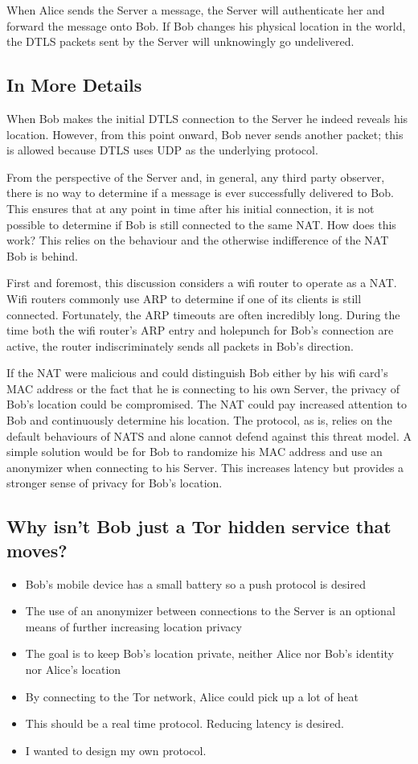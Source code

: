 \documentclass[11pt]{article}
\begin{document}
When Alice sends the Server a message, the Server will authenticate her and
forward the message onto Bob. If Bob changes his physical location in the
world, the DTLS packets sent by the Server will unknowingly go undelivered.

\subsection*{In More Details}
When Bob makes the initial DTLS connection to the Server he indeed reveals his
location. However, from this point onward, Bob never sends another packet; this
is allowed because DTLS uses UDP as the underlying protocol.

From the perspective of the Server and, in general, any third party observer,
there is no way to determine if a message is ever successfully delivered to
Bob. This ensures that at any point in time after his initial connection, it is
not possible to determine if Bob is still connected to the same NAT. How does
this work? This relies on the behaviour and the otherwise indifference of the
NAT Bob is behind.

First and foremost, this discussion considers a wifi router to operate as a
NAT. Wifi routers commonly use ARP to determine if one of its clients is still
connected. Fortunately, the ARP timeouts are often incredibly long. During the
time both the wifi router's ARP entry and holepunch for Bob's connection are
active, the router indiscriminately sends all packets in Bob's direction.

If the NAT were malicious and could distinguish Bob either by his wifi card's
MAC address or the fact that he is connecting to his own Server, the privacy of
Bob's location could be compromised. The NAT could pay increased attention to
Bob and continuously determine his location. The protocol, as is, relies on the
default behaviours of NATS and alone cannot defend against this threat model. A
simple solution would be for Bob to randomize his MAC address and use an
anonymizer when connecting to his Server. This increases latency but provides a
stronger sense of privacy for Bob's location.

\subsection*{Why isn't Bob just a Tor hidden service that moves?}
\begin{itemize}
\item Bob's mobile device has a small battery so a push protocol is desired
\item The use of an anonymizer between connections to the Server is an optional
  means of further increasing location privacy
\item The goal is to keep Bob's location private, neither Alice nor Bob's
  identity nor Alice's location
\item By connecting to the Tor network, Alice could pick up a lot of heat
\item This should be a real time protocol. Reducing latency is desired.
\item I wanted to design my own protocol.
\end{itemize}
\end{document}
